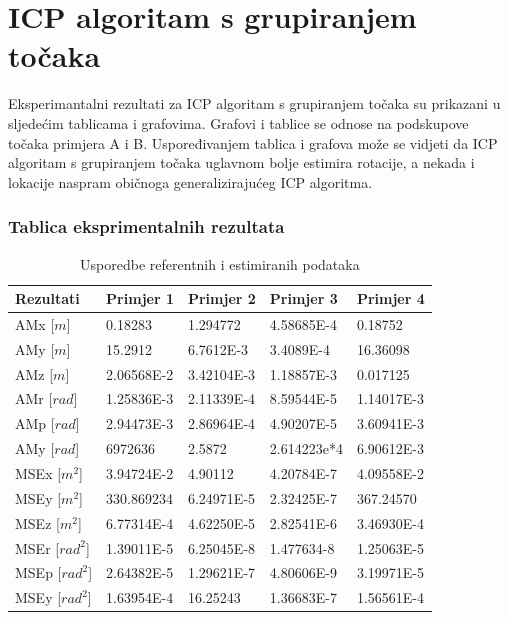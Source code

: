 \section{ICP algoritam s grupiranjem točaka}
Eksperimantalni rezultati za ICP algoritam s grupiranjem točaka su prikazani u sljedećim tablicama i grafovima. Grafovi i tablice se odnose na podskupove točaka primjera A i B. Uspoređivanjem tablica i grafova može se vidjeti da ICP algoritam s grupiranjem točaka uglavnom bolje estimira rotacije, a nekada i lokacije naspram običnoga generalizirajućeg ICP algoritma.

\subsubsection{Tablica eksprimentalnih rezultata}
\begin{table}[H]
  \begin{tabular}{ |p{3cm}| |p{2cm}|p{2cm}|p{2cm}|p{2cm}| }
    \hline
    Rezultati& Primjer 1& Primjer 2&Primjer 3& Primjer 4\\
    \hline
    AMx [$m$]& 0.18283& 1.294772& 4.58685E-4& 0.18752\\
    AMy [$m$]& 15.2912& 6.7612E-3& 3.4089E-4& 16.36098\\
    AMz [$m$]& 2.06568E-2& 3.42104E-3& 1.18857E-3& 0.017125\\
    AMr [$rad$]& 1.25836E-3& 2.11339E-4& 8.59544E-5& 1.14017E-3\\
    AMp [$rad$]& 2.94473E-3& 2.86964E-4& 4.90207E-5& 3.60941E-3\\
    AMy [$rad$]& 6972636& 2.5872& 2.614223e*4& 6.90612E-3\\
    \hline
    MSEx [$m^2$]& 3.94724E-2& 4.90112& 4.20784E-7& 4.09558E-2\\
    MSEy [$m^2$]& 330.869234& 6.24971E-5& 2.32425E-7& 367.24570\\
    MSEz [$m^2$]& 6.77314E-4& 4.62250E-5& 2.82541E-6& 3.46930E-4\\
    MSEr [$rad^2$]& 1.39011E-5& 6.25045E-8& 1.477634-8& 1.25063E-5\\
    MSEp [$rad^2$]& 2.64382E-5& 1.29621E-7& 4.80606E-9& 3.19971E-5\\
    MSEy [$rad^2$]& 1.63954E-4& 16.25243& 1.36683E-7& 1.56561E-4\\
    \hline
  \end{tabular}
  \caption{Usporedbe referentnih i estimiranih podataka}
  \label{res:ref_est_table}
\end{table}
\pagebreak
